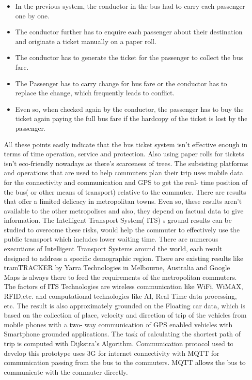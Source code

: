 \begin{itemize}
\item In the previous system, the conductor in the bus had to carry each passenger one by one.
\item The conductor further has to enquire each passenger about their destination and originate a ticket manually on a paper roll.
\item The conductor has to generate the ticket for the passenger to collect the bus fare.
\item The Passenger has to carry change for bus fare or the conductor has to replace the change, which frequently leads to conflict.
\item Even so, when checked again by the conductor, the passenger has to buy the ticket again paying the full bus fare if the hardcopy of the ticket is lost by the passenger.
\end{itemize}  
 All these points easily indicate that the bus ticket system isn't effective enough in terms of time operation, service and protection. Also using paper rolls for tickets isn't eco-friendly nowadays as there's scarceness of trees.
 The subsisting platforms and operations that are used to help commuters plan their trip uses mobile data for the connectivity and communication and GPS to get the real- time position of the bus( or other means of transport) relative to the commuter. There are results that offer a limited delicacy in metropolitan towns. Even so, these results aren't available to the other metropolises and also, they depend on factual data to give information. The Intelligent Transport System( ITS) s ground results can be studied to overcome these risks, would help the commuter to effectively use the public transport which includes lower waiting time. There are numerous executions of Intelligent Transport Systems around the world, each result designed to address a specific demographic region. There are existing results like tramTRACKER by Yarra Technologies in Melbourne, Australia and Google Maps is always there to feed the requirements of the metropolitan commuters. The factors of ITS Technologies are wireless communication like WiFi, WiMAX, RFID,etc. and computational technologies like AI, Real Time data processing, etc. The result is also approximately grounded on the Floating car data, which is based on the collection of place, velocity and direction of trip of the vehicles from mobile phones with a two- way communication of GPS enabled vehicles with Smartphone grounded applications. The task of calculating the shortest path of trip is computed with Dijkstra's Algorithm. Communication protocol used to develop this prototype uses 3G for internet connectivity with MQTT for communication passing from the bus to the commuters. MQTT allows the bus to communicate with the commuter directly.

